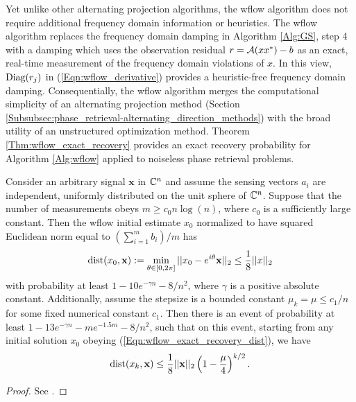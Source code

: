 Yet unlike other alternating projection algorithms, the wflow algorithm does not require additional frequency domain information or heuristics.  
The wflow algorithm replaces the frequency domain damping in Algorithm \ref{Alg:GS}, step 4 with a damping which uses the observation residual $r = {\mathcal A}(xx^*) - b$ as an exact, real-time measurement of the frequency domain violations of $x$.  In this view, $\textnormal{Diag}(r_j)$ in (\ref{Eqn:wflow_derivative}) provides a heuristic-free frequency domain damping.  Consequentially, the wflow algorithm merges the computational simplicity of an alternating projection method (Section  \ref{Subsubsec:phase_retrieval-alternating_direction_methods}) with the broad utility of an unstructured optimization method.  Theorem \ref{Thm:wflow_exact_recovery} provides an exact recovery probability for Algorithm \ref{Alg:wflow} applied to noiseless phase retrieval problems.

\begin{theorem} 			\label{Thm:wflow_exact_recovery}
Consider an arbitrary signal $\mathbf{x}$ in ${\mathbb C}^n$ and assume the sensing vectors $a_i$ are independent, uniformly distributed on the unit sphere of ${\mathbb C}^n$.  Suppose that the number of measurements obeys $m \geq c_0 n \log(n)$, where $c_0$ is a sufficiently large constant.  Then the wflow initial estimate $x_0$ normalized to have squared Euclidean norm equal to $(\sum_{i=1}^m b_i)/m$ has
\begin{equation} 			\label{Eqn:wflow_exact_recovery_dist}
\operatorname{dist}(x_0, \mathbf{x}) := \min\limits_{\theta \in [0, 2\pi]} ||x_0 - e^{i \theta}\mathbf{x} ||_2 \leq \frac{1}{8}||x||_2
\end{equation}
with probability at least $1 - 10e^{-\gamma n} - 8/n^2$, where $\gamma$ is a positive absolute constant.  Additionally, assume the stepsize is a bounded constant $\mu_k = \mu \leq c_1/n$ for some fixed numerical constant $c_1$.  Then there is an event of probability at least $1 - 13e^{- \gamma n} - me^{-1.5m} - 8/n^2$, such that on this event, starting from any initial solution $x_0$ obeying (\ref{Eqn:wflow_exact_recovery_dist}), we have
\begin{equation} 			\label{Eqn:wflow_exact_recovery_rate}
\operatorname{dist}(x_k, \mathbf{x}) \leq \frac{1}{8} ||\mathbf{x}||_2 \left( 1 - \frac{\mu}{4} \right)^{k / 2}.
\end{equation}
\end{theorem}
\begin{proof}
See \cite[Section 7]{DBLP:journals/tit/CandesLS15}.
\end{proof}

